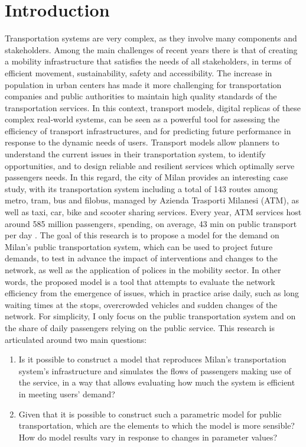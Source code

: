 \chapter{Introduction} \label{ch:intro}


Transportation systems are very complex, as they involve many components and stakeholders. Among the main challenges of recent years there is that of creating a mobility infrastructure that satisfies the needs of all stakeholders, in terms of efficient movement, sustainability, safety and accessibility. The increase in population in urban centers has made it more challenging for transportation companies and public authorities to maintain high quality standards of the transportation services. In this context, transport models, digital replicas of these complex real-world systems, can be seen as a powerful tool for assessing the efficiency of transport infrastructures, and for predicting future performance in response to the dynamic needs of users. Transport models allow planners to understand the current issues in their transportation system, to identify opportunities, and to design reliable and resilient services which optimally serve passengers needs. 
In this regard, the city of Milan provides an interesting case study, with its transportation system including a total of 143 routes among metro, tram, bus and filobus, managed by Azienda Trasporti Milanesi (ATM), as well as taxi, car, bike and scooter sharing services. Every year, ATM services host around 585 million passengers, spending, on average, 43 min on public transport per day \cite{bib2}. The goal of this research is to propose a model for the demand on Milan's public transportation system, which can be used to project future demands, to test in advance the impact of interventions and changes to the network, as well as the application of polices in the mobility sector. In other words, the proposed model is a tool that attempts to evaluate the network efficiency from the emergence of issues, which in practice arise daily, such as long waiting times at the stops, overcrowded vehicles and sudden changes of the network. For simplicity, I only focus on the public transportation system and on the share of daily passengers relying on the public service.
This research is articulated around two main questions:
\begin{enumerate}
    \item Is it possible to construct a model that reproduces Milan's transportation system's infrastructure and simulates the flows of passengers making use of the service, in a way that allows evaluating how much the system is efficient in meeting users' demand?
    \item Given that it is possible to construct such a parametric model for public transportation, which are the elements to which the model is more sensible? How do model results vary in response to changes in parameter values?  
\end{enumerate}
